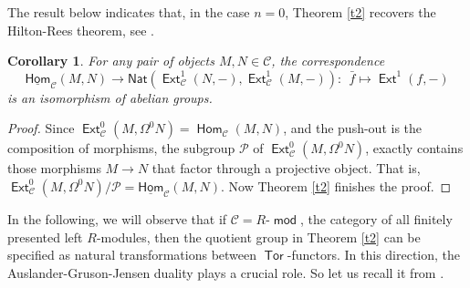 \documentclass[11pt,a4paper]{amsart}
\newcommand{\rt}{\rightarrow}
\newcommand{\lrt}{\longrightarrow}
\newcommand{\C}{\mathscr{C} }
\newcommand{\p}{\mathfrak{p} }
\def\Ext{\operatorname{{\mathsf{Ext}}}}
\def\hom{\operatorname{{\mathsf{Hom}}}}
\def\uhom{\operatorname{\underline{\mathsf{Hom}}}}
\def\Tor{\operatorname{\mathsf{Tor}}}
\def\hom{\operatorname{\mathsf{Hom}}}
\def\md{\operatorname{\mathsf{mod}}}
\def\syz{\mathsf{\Omega}}
\def\p{\mathcal P}
\newcommand{\nat}{{\mathsf{Nat}}}
\newtheorem{cor}[theorem]{Corollary}
\theoremstyle{definition}
\theoremstyle{plain}
\theoremstyle{definition}
\numberwithin{equation}{section}
\begin{document}
The result below indicates that, in the case $n=0$, Theorem \ref{t2} recovers the Hilton-Rees theorem, see \cite[Theorem 7]{mart}.
\begin{cor}\label{c33}For any pair of objects $M, N\in\C$, the correspondence
$$\uhom_{\C}(M, N)\lrt\nat(\Ext^1_{\C}(N, -), \Ext^1_{\C}(M, -)):~~\bar{f}\mapsto\Ext^1(f, -)$$
is an isomorphism of abelian groups.
\end{cor}
\begin{proof}Since $\Ext^0_{\C}(M, \syz^0N)=\hom_{\C}(M, N)$, and the push-out is the composition of morphisms,  the subgroup $\p$ of  $\Ext^0_{\C}(M, \syz^0N)$, exactly contains those morphisms $M\rt N$ that factor through a projective object. That is, $\Ext^0_{\C}(M, \syz^0N)/{\p}=\uhom_{\C}(M, N)$. Now Theorem \ref{t2} finishes the proof.
\end{proof}

In the following, we will observe that if $\C=R$-$\md$, the category of all finitely presented left $R$-modules, then the quotient group in Theorem \ref{t2} can be specified as natural transformations between $\Tor$-functors. In this direction,  the Auslander-Gruson-Jensen duality plays a crucial role.  So let us recall it from \cite{aus1, gj}.
\end{document}
